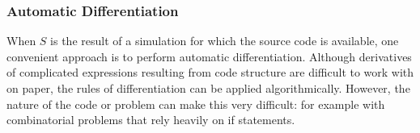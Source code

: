 







%



\subsubsection{Automatic Differentiation}

When $S$ is the result of a simulation for which the source code is available, one convenient approach is to perform automatic differentiation.
Although derivatives of complicated expressions resulting from code structure are difficult to work with on paper, the rules of differentiation can be applied algorithmically.
However, the nature of the code or problem can make this very difficult: for example with combinatorial problems that rely heavily on if statements.

